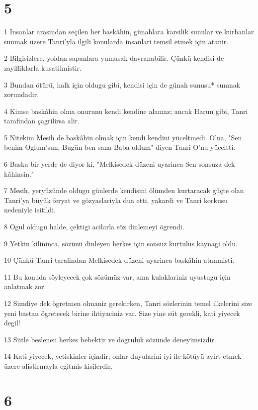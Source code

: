 \chapter{5}

\par 1 Insanlar arasindan seçilen her baskâhin, günahlara karsilik sunular ve kurbanlar sunmak üzere Tanri'yla ilgili konularda insanlari temsil etmek için atanir.
\par 2 Bilgisizlere, yoldan sapanlara yumusak davranabilir. Çünkü kendisi de zayifliklarla kusatilmistir.
\par 3 Bundan ötürü, halk için oldugu gibi, kendisi için de günah sunusu* sunmak zorundadir.
\par 4 Kimse baskâhin olma onurunu kendi kendine alamaz; ancak Harun gibi, Tanri tarafindan çagrilirsa alir.
\par 5 Nitekim Mesih de baskâhin olmak için kendi kendini yüceltmedi. O'na, "Sen benim Oglum'sun, Bugün ben sana Baba oldum" diyen Tanri O'nu yüceltti.
\par 6 Baska bir yerde de diyor ki, "Melkisedek düzeni uyarinca Sen sonsuza dek kâhinsin."
\par 7 Mesih, yeryüzünde oldugu günlerde kendisini ölümden kurtaracak güçte olan Tanri'ya büyük feryat ve gözyaslariyla dua etti, yakardi ve Tanri korkusu nedeniyle isitildi.
\par 8 Ogul oldugu halde, çektigi acilarla söz dinlemeyi ögrendi.
\par 9 Yetkin kilininca, sözünü dinleyen herkes için sonsuz kurtulus kaynagi oldu.
\par 10 Çünkü Tanri tarafindan Melkisedek düzeni uyarinca baskâhin atanmisti.
\par 11 Bu konuda söyleyecek çok sözümüz var, ama kulaklariniz uyustugu için anlatmak zor.
\par 12 Simdiye dek ögretmen olmaniz gerekirken, Tanri sözlerinin temel ilkelerini size yeni bastan ögretecek birine ihtiyaciniz var. Size yine süt gerekli, kati yiyecek degil!
\par 13 Sütle beslenen herkes bebektir ve dogruluk sözünde deneyimsizdir.
\par 14 Kati yiyecek, yetiskinler içindir; onlar duyularini iyi ile kötüyü ayirt etmek üzere alistirmayla egitmis kisilerdir.

\chapter{6}

